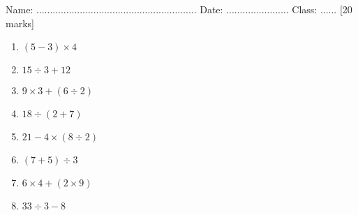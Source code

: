 \documentclass{article}
\date{}
\begin{document}
\fontsize{13}{15} \selectfont %

\begin{center}
  \qquad \\ 
\end{center} \\ 

Name: ...........................................................  \hspace{0.5cm}  Date: ....................... \hspace{0.5cm}  Class: ......\hspace{0.5cm} [20 marks]

\begin{enumerate}
\item \quad \( (5 - 3) \times 4 \)
\vspace{45pt}
\hline
\vspace{5pt}

\item \quad \( 15 \div 3 + 12 \)
\vspace{45pt}
\hline
\vspace{5pt}

\item \quad \( 9 \times 3 + (6 \div 2) \)
\vspace{45pt}
\hline
\vspace{5pt}

\item \quad \( 18 \div (2 + 7) \)
\vspace{45pt}
\hline
\vspace{5pt}

\item \quad \( 21 - 4 \times (8 \div 2) \)
\vspace{45pt}
\hline
\vspace{5pt}

\item \quad \( (7 + 5) \div 3 \)
\vspace{45pt}
\hline
\vspace{5pt}

\item \quad \( 6 \times 4 + (2 \times 9) \)
\vspace{45pt}
\hline
\vspace{5pt}

\item \quad \( 33 \div 3 - 8 \)
\vspace{45pt}
\hline
\vspace{5pt}


\end{enumerate}
\end{document}
